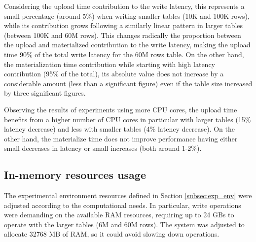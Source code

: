 Considering the upload time contribution to the write latency, this represents a small percentage (around 5\%) when writing smaller tables (10K and 100K rows), while its contribution grows following a similarly linear pattern in larger tables (between 100K and 60M rows). This changes radically the proportion between the upload and materialized contribution to the write latency, making the upload time 90\% of the total write latency for the 60M rows table. On the other hand, the materialization time contribution while starting with high latency contribution (95\% of the total), its absolute value does not increase by a considerable amount (less than a significant figure) even if the table size increased by three significant figures.

Observing the results of experiments using more \gls{CPU} cores, the upload time benefits from a higher number of \gls{CPU} cores in particular with larger tables (15\% latency decrease) and less with smaller tables (4\% latency decrease). On the other hand, the materialize time does not improve performance having either small decreases in latency or small increases (both around 1-2\%).

\subsection{In-memory resources usage}
\label{subsec:resources_usage}

The experimental environment resources defined in Section \ref{subsec:exp_env} were adjusted according to the computational needs. In particular, write operations were demanding on the available \gls{RAM} resources, requiring up to 24 GBs to operate with the larger tables (6M and 60M rows). The system was adjusted to allocate 32768 MB of \gls{RAM}, so it could avoid slowing down operations.